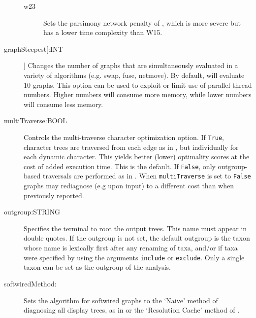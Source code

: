 \begin{description}
\begin{description}
			\item[w23] Sets the parsimony network penalty of \cite{WheelerandWashburn2023}, 
			which is more severe but has a lower time complexity than W15.
			
		\end{description}
			
		\item[graphSteepest[:INT]] Changes the number of graphs that are simultaneously 
		evaluated in a variety of algorithms (e.g. swap, fuse, netmove). By default, \phyg 
		will evaluate 10 graphs. This option can be used to exploit or limit use of parallel 
		thread numbers. Higher numbers will consume more memory, while lower numbers 
		will consume less memory. 
		
		
		\item[multiTraverse:BOOL] Controls the multi-traverse character optimization option. 
		If \texttt{True}, character trees are traversed from each edge as in 
		\citep{VaronandWheeler2012,VaronandWheeler2013, POY4, POY5}, but individually 
		for each dynamic character. This yields better (lower) optimality 
		scores at the cost of added execution time. This is the default. If \texttt{False}, only 
		outgroup-based traversals are performed as in \citep{Wheeler1996, POY2, POY3}. 
		When \texttt{multiTraverse} is set to \texttt{False} graphs may rediagnose (e.g upon 
		input) to a different cost than when previously reported. 
		
			
		\item[outgroup:STRING] Specifies the terminal to root the output trees. 
		This name must appear in double quotes. If the outgroup is not set, the 
		default outgroup is the taxon whose name is lexically first after any renaming 
		of taxa, and/or if taxa were specified by using the arguments \texttt{include} 
		or \texttt{exclude}. Only a single taxon can be set as the outgroup of the analysis. 
			
		 \item[softwiredMethod:] Sets the algorithm for softwired graphs to the 
		 `Naive' method of diagnosing all display trees, as in \cite{Wheeler2015} or
		 the `Resolution Cache' method of \cite{WheelerandWashburn2023}.
				

\end{description}
